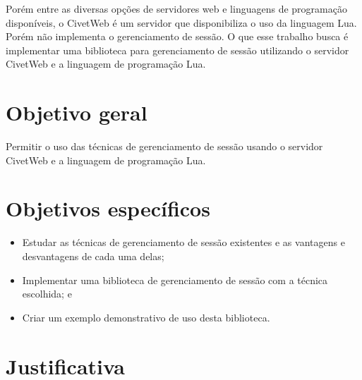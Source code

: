 Porém entre as diversas opções de servidores web e linguagens de programação disponíveis, o CivetWeb é um servidor que disponibiliza o uso da linguagem Lua. Porém não implementa o gerenciamento de sessão. O que esse trabalho busca é implementar uma biblioteca para gerenciamento de sessão utilizando o servidor CivetWeb e a linguagem de programação Lua.




\section{Objetivo geral}

Permitir o uso das técnicas de gerenciamento de sessão usando o servidor CivetWeb e a linguagem de programação Lua.


\section{Objetivos específicos}

\begin{itemize}
	\item Estudar as técnicas de gerenciamento de sessão existentes e as vantagens e desvantagens de cada uma delas;
	\item Implementar uma biblioteca de gerenciamento de sessão com a técnica escolhida; e
	\item Criar um exemplo demonstrativo de uso desta biblioteca.
\end{itemize}




\section{Justificativa}

